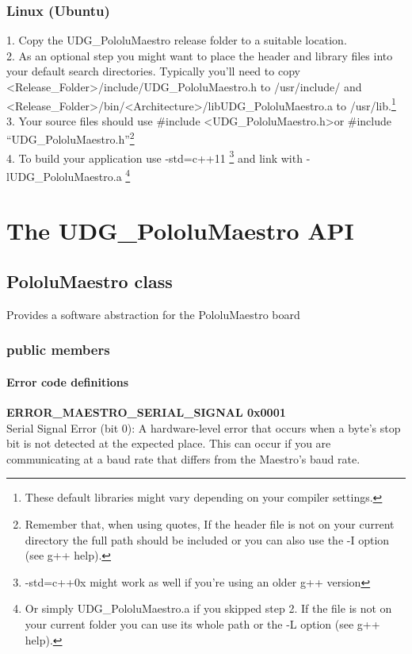 \documentclass[letterpaper]{book}
\begin{document}
\subsection{Linux (Ubuntu)}
1. Copy the UDG\_PololuMaestro release folder to a suitable location.\\
2. As an optional step you might want to place the header and library files into your default search directories. Typically you'll need to copy \textless{}Release\_Folder\textgreater{}/include/UDG\_PololuMaestro.h to /usr/include/ and \textless{}Release\_Folder\textgreater{}/bin/\textless{}Architecture\textgreater{}/libUDG\_PololuMaestro.a to /usr/lib.\footnote{These default libraries might vary depending on your compiler settings.}\\
3. Your source files should use \#include \textless UDG\_PololuMaestro.h\textgreater or \#include ``UDG\_PololuMaestro.h''\footnote{Remember that, when using quotes, If the header file is not on your current directory the full path should be included or you can also use the -I option (see g++ help).}\\
4. To build your application use -std=c++11 \footnote{ -std=c++0x might work as well if you're using an older g++ version} and link with -lUDG\_PololuMaestro.a \footnote{Or simply UDG\_PololuMaestro.a if you skipped step 2. If the file is not on your current folder you can use its whole path or the -L option (see g++ help).}


\chapter{The UDG\_PololuMaestro API}
\section{PololuMaestro class}
Provides a software abstraction for the PololuMaestro board

\subsection{public members}
\subsubsection{Error code definitions}
\label{sec:errorCodes}
\textbf{ERROR\_MAESTRO\_SERIAL\_SIGNAL 0x0001}\\
Serial Signal Error (bit 0): A hardware-level error that occurs when a byte’s stop bit is not detected at the expected place. This can occur if you are communicating at a baud rate that differs from the Maestro’s baud rate.\\
\end{document}
